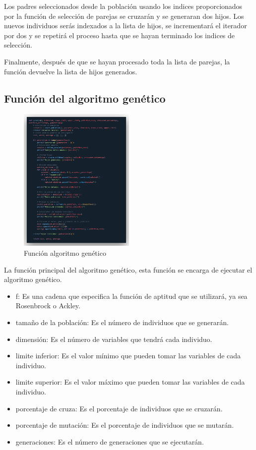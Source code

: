 \documentclass{report}
\begin{document}
    Los padres seleccionados desde la población usando los indices proporcionados por la función de selección de parejas se cruzarán y se generaran dos hijos.
    Los nuevos individuos serás indexados a la lista de hijos, se incrementará el iterador por dos y se repetirá el proceso hasta que se hayan terminado los indices de selección.

    Finalmente, después de que se hayan procesado toda la lista de parejas, la función devuelve la lista de hijos generados.

    \subsection*{Función del algoritmo genético}

    \begin{figure}[h]
        \centering
        \includegraphics[width=0.5\textwidth]{funcionGenetico.png}
        \caption{Función algoritmo genético}
    \end{figure}

    La función principal del algoritmo genético, esta función se encarga de ejecutar el algoritmo genético.

    \begin{itemize}
        \item f: Es una cadena que especifica la función de aptitud que se utilizará, ya sea Rosenbrock o Ackley.
        \item tamaño de la población: Es el número de individuos que se generarán.
        \item dimensión: Es el número de variables que tendrá cada individuo.
        \item limite inferior: Es el valor mínimo que pueden tomar las variables de cada individuo.
        \item limite superior: Es el valor máximo que pueden tomar las variables de cada individuo.
        \item porcentaje de cruza: Es el porcentaje de individuos que se cruzarán.
        \item porcentaje de mutación: Es el porcentaje de individuos que se mutarán.
        \item generaciones: Es el número de generaciones que se ejecutarán.
    \end{itemize}
\end{document}
